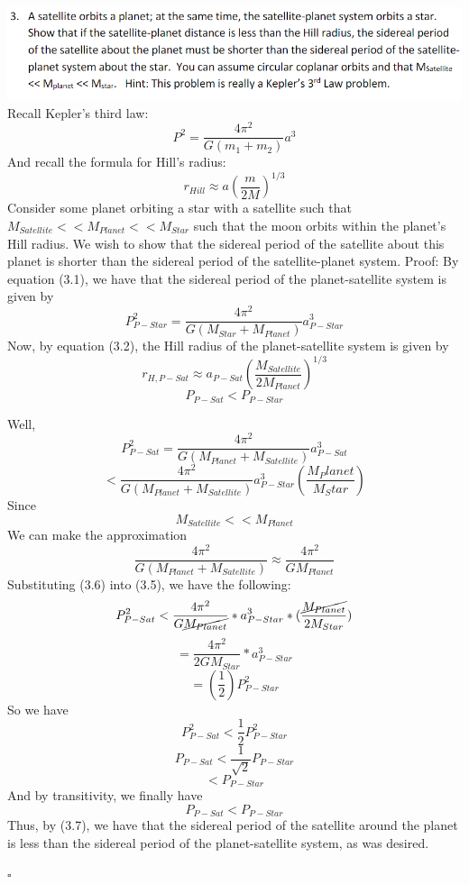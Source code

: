 \documentclass{article}
\begin{document}
\section{}
\includegraphics[scale = 0.8]{probset2prob3.PNG}
Recall Kepler's third law:
\begin{equation}
    P^2 = \frac{4 \pi^2}{G(m_1 + m_2)}a^3
\end{equation}
And recall the formula for Hill's radius:
\begin{equation}
    r_{Hill} \approx a(\frac{m}{2M})^{1/3}
\end{equation}
Consider some planet orbiting a star with a satellite such that $M_{Satellite} << M_{Planet} << M_{Star}$ such that the moon orbits within the planet's Hill radius. We wish to show that the sidereal period of the satellite about this planet is shorter than the sidereal period of the satellite-planet system.
\newline\newline
Proof: By equation (3.1), we have that the sidereal period of the planet-satellite system is given by 
\begin{equation}
    P_{P-Star}^2 = \frac{4 \pi^2}{G(M_{Star} + M_{Planet})}a_{P-Star}^3
\end{equation}
Now, by equation (3.2), the Hill radius of the planet-satellite system is given by
\begin{equation}
    r_{H, P-Sat} \approx a_{P-Sat}(\frac{M_{Satellite}}{2M_{Planet}})^{1/3}
\end{equation}
\[P_{P-Sat} < P_{P-Star}\]

Well, 
\[P_{P-Sat}^2 = \frac{4 \pi^2}{G(M_{Planet}+M_{Satellite})}a_{P-Sat}^3\]
\begin{equation}
    < \frac{4 \pi^2}{G(M_{Planet}+M_{Satellite})}a_{P-Star}^3(\frac{M_Planet}{M_Star})
\end{equation}
Since
\[M_{Satellite} << M_{Planet}\]
We can make the approximation
\begin{equation}
    \frac{4 \pi^2}{G(M_{Planet} + M_{Satellite})} \approx \frac{4 \pi^2}{GM_{Planet}}
\end{equation}
Substituting (3.6) into (3.5), we have the following:
\[P_{P-Sat}^2 < \frac{4 \pi^2}{G\cancel{M_{Planet}}} * a_{P-Star}^3*(\frac{\cancel{M_{Planet}}}{2M_{Star}})\]
\[= \frac{4 \pi^2}{2GM_{Star}}*a_{P-Star}^3\]
\[ = (\frac{1}{2})P_{P-Star}^2 \]
So we have
\[P_{P-Sat}^2 < \frac{1}{2}P_{P-Star}^2\]
\[P_{P-Sat} < \frac{1}{\sqrt{2}}P_{P-Star}\]
\[ < P_{P-Star}\]
And by transitivity, we finally have
\begin{equation}
    P_{P-Sat} < P_{P-Star}
\end{equation}
Thus, by (3.7), we have that the sidereal period of the satellite around the planet is less than the sidereal period of the planet-satellite system, as was desired.
\begin{flushright}
    $\square$
\end{flushright}
\end{document}
